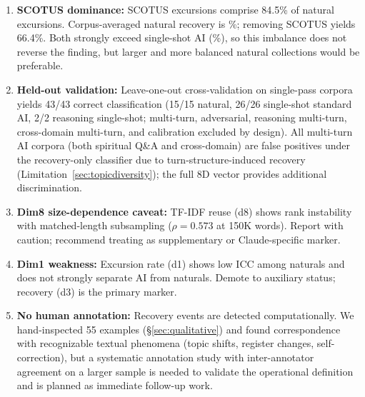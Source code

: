 \documentclass[final]{clv2025}
\begin{document}
\begin{enumerate}
This identifies multi-turn generation structure as a boundary condition for the recovery-based classifier. However, multi-turn AI corpora remain distinguishable on other dimensions: d5 (compression SD) ranges 0.006--0.044, consistent with standard AI ranges and below the dialogue/channeling natural range ($\geq$0.044), though overlapping institutional/prose naturals (FOMC 0.011, Gutenberg 0.012). d8 (TF-IDF reuse) ranges 0.67--0.96, meaning the full 8-dimensional vector still provides additional discrimination.

\item \textbf{SCOTUS dominance:} SCOTUS excursions comprise 84.5\% of natural excursions. Corpus-averaged natural recovery is \recNatCorpusAvg\%; removing SCOTUS yields 66.4\%. Both strongly exceed single-shot AI (\recAISingleShot\%), so this imbalance does not reverse the finding, but larger and more balanced natural collections would be preferable.

\item \textbf{Held-out validation:} Leave-one-out cross-validation on single-pass corpora yields 43/43 correct classification (15/15 natural, 26/26 single-shot standard AI, 2/2 reasoning single-shot; multi-turn, adversarial, reasoning multi-turn, cross-domain multi-turn, and calibration excluded by design). All multi-turn AI corpora (both spiritual Q\&A and cross-domain) are false positives under the recovery-only classifier due to turn-structure-induced recovery (Limitation~\ref{sec:topicdiversity}); the full 8D vector provides additional discrimination.

\item \textbf{Dim8 size-dependence caveat:} TF-IDF reuse (d8) shows rank instability with matched-length subsampling ($\rho = 0.573$ at 150K words). Report with caution; recommend treating as supplementary or Claude-specific marker.

\item \textbf{Dim1 weakness:} Excursion rate (d1) shows low ICC among naturals and does not strongly separate AI from naturals. Demote to auxiliary status; recovery (d3) is the primary marker.

\item \textbf{No human annotation:} Recovery events are detected computationally. We hand-inspected 55 examples (\S\ref{sec:qualitative}) and found correspondence with recognizable textual phenomena (topic shifts, register changes, self-correction), but a systematic annotation study with inter-annotator agreement on a larger sample is needed to validate the operational definition and is planned as immediate follow-up work.


\end{enumerate}
\end{document}
